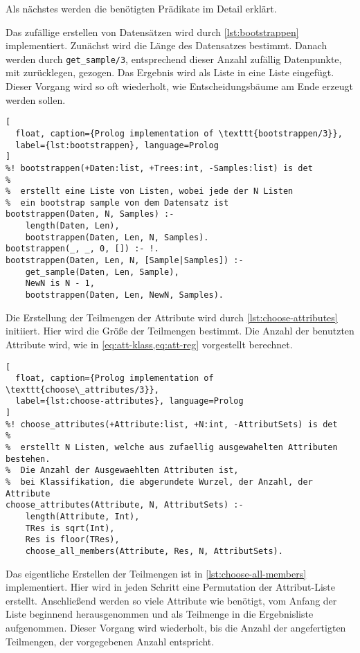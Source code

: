 Als nächstes werden die benötigten Prädikate im Detail erklärt.

Das zufällige erstellen von Datensätzen wird durch \cref{lst:bootstrappen} implementiert.
Zunächst wird die Länge des Datensatzes bestimmt. Danach werden durch \texttt{get\_sample/3},
entsprechend dieser Anzahl zufällig Datenpunkte, mit zurücklegen, gezogen. Das Ergebnis wird als
Liste in eine Liste eingefügt. Dieser Vorgang wird so oft wiederholt, wie Entscheidungsbäume am Ende
erzeugt werden sollen.

\begin{lstlisting}[
  float, caption={Prolog implementation of \texttt{bootstrappen/3}},
  label={lst:bootstrappen}, language=Prolog
]
%! bootstrappen(+Daten:list, +Trees:int, -Samples:list) is det
%
%  erstellt eine Liste von Listen, wobei jede der N Listen
%  ein bootstrap sample von dem Datensatz ist
bootstrappen(Daten, N, Samples) :-
    length(Daten, Len),
    bootstrappen(Daten, Len, N, Samples).
bootstrappen(_, _, 0, []) :- !.
bootstrappen(Daten, Len, N, [Sample|Samples]) :-
    get_sample(Daten, Len, Sample),
    NewN is N - 1,
    bootstrappen(Daten, Len, NewN, Samples).
\end{lstlisting}

Die Erstellung der Teilmengen der Attribute wird durch \cref{lst:choose-attributes} initiiert.
Hier wird die Größe der Teilmengen bestimmt. Die Anzahl der benutzten Attribute
wird, wie in \cref{eq:att-klass,eq:att-reg} vorgestellt berechnet.

\begin{lstlisting}[
  float, caption={Prolog implementation of \texttt{choose\_attributes/3}},
  label={lst:choose-attributes}, language=Prolog
]
%! choose_attributes(+Attribute:list, +N:int, -AttributSets) is det
%
%  erstellt N Listen, welche aus zufaellig ausgewahelten Attributen bestehen.
%  Die Anzahl der Ausgewaehlten Attributen ist,
%  bei Klassifikation, die abgerundete Wurzel, der Anzahl, der Attribute
choose_attributes(Attribute, N, AttributSets) :-
    length(Attribute, Int),
    TRes is sqrt(Int),
    Res is floor(TRes),
    choose_all_members(Attribute, Res, N, AttributSets).
\end{lstlisting}

Das eigentliche Erstellen der Teilmengen ist in \cref{lst:choose-all-members} implementiert.
Hier wird in jeden Schritt eine Permutation der Attribut-Liste erstellt. Anschließend
werden so viele Attribute wie benötigt, vom Anfang der Liste beginnend herausgenommen und als
Teilmenge in die Ergebnisliste aufgenommen.
Dieser Vorgang wird wiederholt, bis die Anzahl der angefertigten Teilmengen,
der vorgegebenen Anzahl entspricht.

